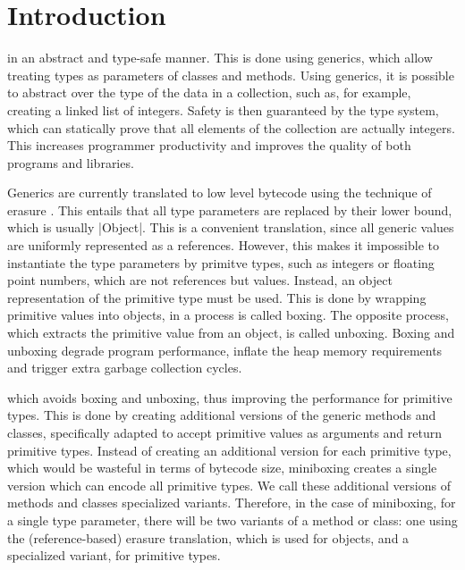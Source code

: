 \section{Introduction}

 in an abstract and type-safe manner. This is done using generics, which allow treating types as parameters of classes and methods. Using generics, it is possible to abstract over the type of the data in a collection, such as, for example, creating a linked list of integers. Safety is then guaranteed by the type system, which can statically prove that all elements of the collection are actually integers. This increases programmer productivity and improves the quality of both programs and libraries.

Generics are currently translated to low level bytecode using the technique of erasure \cite{java-erasure}. This entails that all type parameters are replaced by their lower bound, which is usually |Object|. This is a convenient translation, since all generic values are uniformly represented as a references. However, this makes it impossible to instantiate the type parameters by primitve types, such as integers or floating point numbers, which are not references but values. Instead, an object representation of the primitive type must be used. This is done by wrapping primitive values into objects, in a process is called boxing. The opposite process, which extracts the primitive value from an object, is called unboxing. Boxing and unboxing degrade program performance, inflate the heap memory requirements and trigger extra garbage collection cycles.

 which avoids boxing and unboxing, thus improving the performance for primitive types. This is done by creating additional versions of the generic methods and classes, specifically adapted to accept primitive values as arguments and return primitive types. Instead of creating an additional version for each primitive type, which would be wasteful in terms of bytecode size, miniboxing creates a single version which can encode all primitive types. We call these additional versions of methods and classes specialized variants. Therefore, in the case of miniboxing, for a single type parameter, there will be two variants of a method or class: one using the (reference-based) erasure translation, which is used for objects, and a specialized variant, for primitive types.

